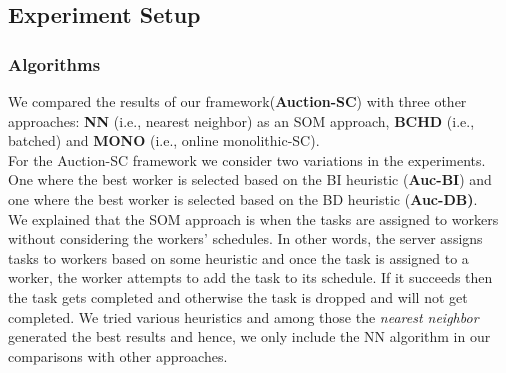 

\subsection{Experiment Setup}
\label{subsec:exp_setup}

\subsubsection{Algorithms}
We compared the results of our framework(\textbf{Auction-SC}) with three other approaches: \textbf{NN} (i.e., nearest neighbor) as an SOM approach, \textbf{BCHD} (i.e., batched) and \textbf{MONO} (i.e., online monolithic-SC).\\

For the Auction-SC framework we consider two variations in the experiments. One where the best worker is selected based on the BI heuristic (\textbf{Auc-BI}) and one where the best worker is selected based on the BD heuristic (\textbf{Auc-DB)}.\\

We explained that the SOM approach is when the tasks are assigned to workers without considering the workers' schedules. In other words, the server assigns tasks to workers based on some heuristic and once the task is assigned to a worker, the worker attempts to add the task to its schedule. If it succeeds then the task gets completed and otherwise the task is dropped and will not get completed. We tried various heuristics and among those the \textit{nearest neighbor} generated the best results and hence, we only include the NN algorithm in our comparisons with other approaches.\\

